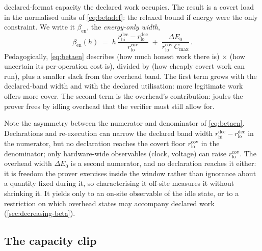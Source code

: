 \documentclass{article}
\theoremstyle{plain}
\theoremstyle{definition}
\theoremstyle{remark}
\begin{document}
declared-format capacity the declared work occupies. The result is a covert load in the
normalised units of \cref{eq:betadef}: the relaxed bound if energy
were the only constraint. We write it $\beta_{\mathrm{en}}$, the
\emph{energy-only width},
\begin{equation}
\;\beta_{\mathrm{en}}(h) \;=\; h\,
		\frac{r_{\mathrm{hi}}^{\mathrm{dec}} - r_{\mathrm{lo}}^{\mathrm{dec}}}{r_{\mathrm{lo}}^{\mathrm{cov}}}
		\;+\; \frac{\Delta E_0}{r_{\mathrm{lo}}^{\mathrm{cov}}\,C_{\max}}\,.\;
	\label{eq:betaen}
\end{equation}
Pedagogically, \cref{eq:betaen} describes (how much honest work there is) $\times$ (how uncertain its
per-operation cost is), divided by (how cheaply covert work can run), plus a
smaller slack from the overhead band. The first term grows with the
declared-band width and with the declared utilisation: more legitimate work
offers more cover. The second term is the overhead's contribution: joules
the prover frees by idling overhead that the verifier must still allow for.

Note the asymmetry between the numerator and denominator of \cref{eq:betaen}.
Declarations and re-execution can narrow the declared band width
$r_{\mathrm{hi}}^{\mathrm{dec}} - r_{\mathrm{lo}}^{\mathrm{dec}}$ in the
numerator, but no declaration reaches the covert floor
$r_{\mathrm{lo}}^{\mathrm{cov}}$ in the denominator; only hardware-wide
observables (clock, voltage) can raise $r_{\mathrm{lo}}^{\mathrm{cov}}$. The
overhead width $\Delta E_0$ is a second numerator, and no declaration reaches
it either: it is freedom the prover exercises inside the window rather than
ignorance about a quantity fixed during it, so characterising it off-site
measures it without shrinking it. It yields only to an on-site observable of
the idle state, or to a restriction on which overhead states may accompany
declared work (\cref{sec:decreasing-beta}).

\subsection{The capacity clip}
\label{subsec:capclip}
\end{document}
